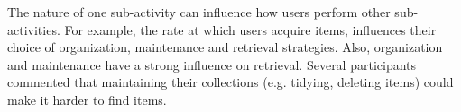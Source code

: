 \begin{itemize}
The nature of one sub-activity can influence how users perform other sub-activities. For example, the rate at which users acquire items, influences their choice of organization, maintenance and retrieval strategies.
Also, organization and maintenance have a strong influence on retrieval.  Several participants commented that maintaining their collections (e.g. tidying, deleting items) could make it harder to find items.  %

\end{itemize}






